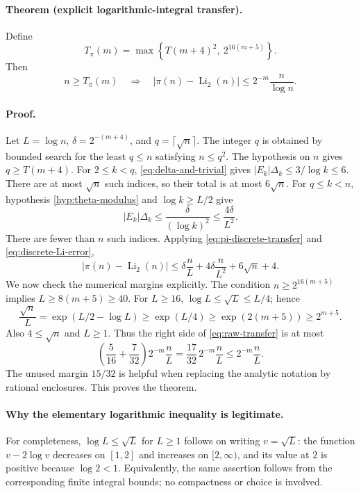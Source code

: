 \paragraph{Theorem (explicit logarithmic-integral transfer).}
Define
\[
 T_\pi(m)=\max\left\{T(m+4)^2,\ 2^{16(m+5)}\right\}.
\]
Then
\begin{equation}\label{eq:pi-modulus}
 n\ge T_\pi(m)\quad\Longrightarrow\quad
 |\pi(n)-\operatorname{Li}_2(n)|
       \le 2^{-m}\frac n{\log n}.
\end{equation}

\paragraph{Proof.}
Let $L=\log n$, $\delta=2^{-(m+4)}$, and
$q=\lceil\sqrt n\rceil$.  The integer $q$ is obtained by bounded search
for the least $q\le n$ satisfying $n\le q^2$.
The hypothesis on $n$ gives $q\ge T(m+4)$.
For $2\le k<q$, \eqref{eq:delta-and-trivial} gives
$|E_k|\Delta_k\le3/\log k\le6$.
There are at most $\sqrt n$ such indices, so their total is at most
$6\sqrt n$.
For $q\le k<n$, hypothesis \eqref{hyp:theta-modulus} and
$\log k\ge L/2$ give
\[
 |E_k|\Delta_k\le\frac\delta{(\log k)^2}
                         \le\frac{4\delta}{L^2}.
\]
There are fewer than $n$ such indices.  Applying
\eqref{eq:pi-discrete-transfer} and \eqref{eq:discrete-Li-error},
\begin{equation}\label{eq:raw-transfer}
 |\pi(n)-\operatorname{Li}_2(n)|
 \le\delta\frac nL+4\delta\frac n{L^2}+6\sqrt n+4.
\end{equation}
We now check the numerical margins explicitly.  The condition
$n\ge2^{16(m+5)}$ implies $L\ge8(m+5)\ge40$.
For $L\ge16$, $\log L\le\sqrt L\le L/4$; hence
\[
 \frac{\sqrt n}{L}
   =\exp(L/2-\log L)
   \ge\exp(L/4)
   \ge\exp(2(m+5))\ge2^{m+5}.
\]
Also $4\le\sqrt n$ and $L\ge1$.  Thus the right side of
\eqref{eq:raw-transfer} is at most
\[
 \left(\frac5{16}+\frac7{32}\right)2^{-m}\frac nL
 =\frac{17}{32}\,2^{-m}\frac nL
 \le2^{-m}\frac nL.
\]
The unused margin $15/32$ is helpful when replacing the analytic notation
by rational enclosures.  This proves the theorem.

\paragraph{Why the elementary logarithmic inequality is legitimate.}
For completeness, $\log L\le\sqrt L$ for $L\ge1$ follows on writing
$v=\sqrt L$: the function $v-2\log v$ decreases on $[1,2]$ and increases
on $[2,\infty)$, and its value at $2$ is positive because $\log2<1$.
Equivalently, the same assertion follows from the corresponding finite
integral bounds; no compactness or choice is involved.

